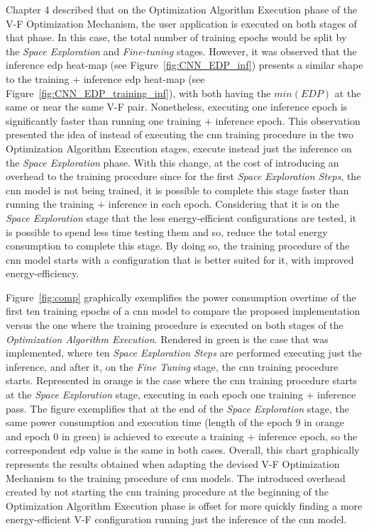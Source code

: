 Chapter 4 described that on the Optimization Algorithm Execution phase of the V-F Optimization Mechanism, the user application is executed on both stages of that phase. In this case, the total number of training epochs would be split by the \textit{Space Exploration} and \textit{Fine-tuning} stages. However, it was observed that the inference \acrshort{edp} heat-map (see Figure~\ref{fig:CNN_EDP_inf}) presents a similar shape to the training + inference \acrshort{edp} heat-map (see Figure~\ref{fig:CNN_EDP_training_inf}), with both having the $min(EDP)$ at the same or near the same V-F pair.
Nonetheless, executing one inference epoch is significantly faster than running one training + inference epoch. This observation presented the idea of instead of executing the \acrshort{cnn} training procedure in the two Optimization Algorithm Execution stages, execute instead just the inference on the \textit{Space Exploration} phase. With this change, at the cost of introducing an overhead to the training procedure since for the first \textit{Space Exploration Steps}, the \acrshort{cnn} model is not being trained, it is possible to complete this stage faster than running the training + inference in each epoch.
Considering that it is on the \textit{Space Exploration} stage that the less energy-efficient configurations are tested, it is possible to spend less time testing them and so, reduce the total energy consumption to complete this stage. 
By doing so, the training procedure of the \acrshort{cnn} model starts with a configuration that is better suited for it, with improved energy-efficiency. 

Figure~\ref{fig:comp} graphically exemplifies the power consumption overtime of the first ten training epochs of a \acrshort{cnn} model to compare the proposed implementation versus the one where the training procedure is executed on both stages of the \textit{Optimization Algorithm Execution}. Rendered in green is the case that was implemented, where ten \textit{Space Exploration Steps} are performed executing just the inference, and after it, on the \textit{Fine Tuning} stage, the \acrshort{cnn} training procedure starts. Represented in orange is the case where the \acrshort{cnn} training procedure starts at the \textit{Space Exploration} stage, executing in each epoch one training + inference pass. The figure exemplifies that at the end of the \textit{Space Exploration} stage, the same power consumption and execution time (length of the epoch 9 in orange and epoch 0 in green) is achieved to execute a training + inference epoch, so the correspondent \acrshort{edp} value is the same in both cases. Overall, this chart graphically represents the results obtained when adapting the devised V-F Optimization Mechanism to the training procedure of \acrshort{cnn} models. The introduced overhead created by not starting the \acrshort{cnn} training procedure at the beginning of the Optimization Algorithm Execution phase is offset for more quickly finding a more energy-efficient V-F configuration running just the inference of the \acrshort{cnn} model.

